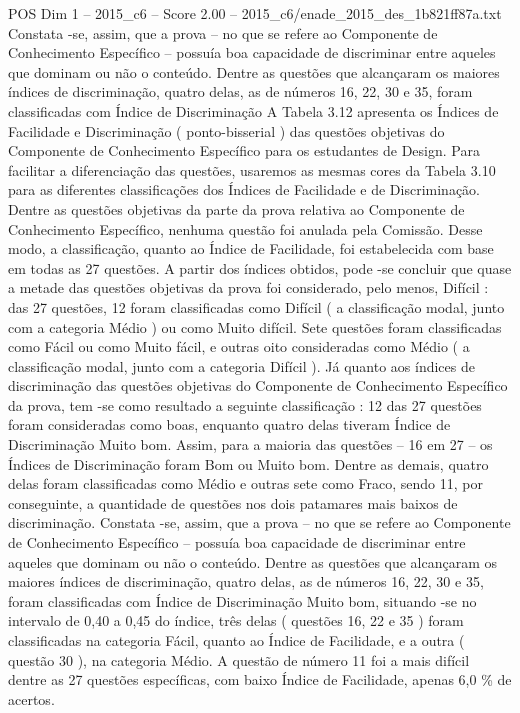\begin{textsample}{POS Dim 1 – 2015\_c6 – Score 2.00 – 2015\_c6/enade\_2015\_des\_1b821ff87a.txt}
Constata -se, assim, que a prova – no que se refere ao Componente de Conhecimento Específico – possuía boa capacidade de discriminar entre aqueles que dominam ou não o conteúdo.
Dentre as questões que alcançaram os maiores índices de discriminação, quatro delas, as de números 16, 22, 30 e 35, foram classificadas com Índice de Discriminação A Tabela 3.12 apresenta os Índices de Facilidade e Discriminação ( ponto-bisserial ) das questões objetivas do Componente de Conhecimento Específico para os estudantes de Design.
Para facilitar a diferenciação das questões, usaremos as mesmas cores da Tabela 3.10 para as diferentes classificações dos Índices de Facilidade e de Discriminação.
Dentre as questões objetivas da parte da prova relativa ao Componente de Conhecimento Específico, nenhuma questão foi anulada pela Comissão.
Desse modo, a classificação, quanto ao Índice de Facilidade, foi estabelecida com base em todas as 27 questões.
A partir dos índices obtidos, pode -se concluir que quase a metade das questões objetivas da prova foi considerado, pelo menos, Difícil : das 27 questões, 12 foram classificadas como Difícil ( a classificação modal, junto com a categoria Médio ) ou como Muito difícil.
Sete questões foram classificadas como Fácil ou como Muito fácil, e outras oito consideradas como Médio ( a classificação modal, junto com a categoria Difícil ).
Já quanto aos índices de discriminação das questões objetivas do Componente de Conhecimento Específico da prova, tem -se como resultado a seguinte classificação : 12 das 27 questões foram consideradas como boas, enquanto quatro delas tiveram Índice de Discriminação Muito bom.
Assim, para a maioria das questões – 16 em 27 – os Índices de Discriminação foram Bom ou Muito bom.
Dentre as demais, quatro delas foram classificadas como Médio e outras sete como Fraco, sendo 11, por conseguinte, a quantidade de questões nos dois patamares mais baixos de discriminação.
Constata -se, assim, que a prova – no que se refere ao Componente de Conhecimento Específico – possuía boa capacidade de discriminar entre aqueles que dominam ou não o conteúdo.
Dentre as questões que alcançaram os maiores índices de discriminação, quatro delas, as de números 16, 22, 30 e 35, foram classificadas com Índice de Discriminação Muito bom, situando -se no intervalo de 0,40 a 0,45 do índice, três delas ( questões 16, 22 e 35 ) foram classificadas na categoria Fácil, quanto ao Índice de Facilidade, e a outra ( questão 30 ), na categoria Médio.
A questão de número 11 foi a mais difícil dentre as 27 questões específicas, com baixo Índice de Facilidade, apenas 6,0 \% de acertos.

\end{textsample}
